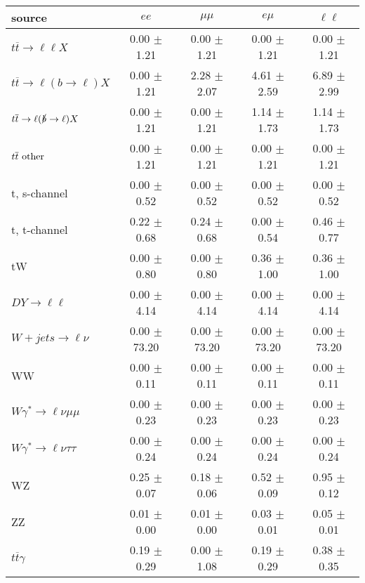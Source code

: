 \begin{tabular}{l|cccc} \hline\hline
source & $ee$ & $\mu\mu$ & $e\mu$ & $\ell\ell $ \\
\hline
$t\overline{t} \rightarrow \ell \ell X$ &  0.00 $\pm$  1.21 &  0.00 $\pm$  1.21 &  0.00 $\pm$  1.21 &  0.00 $\pm$  1.21 \\
$t\overline{t} \rightarrow \ell (b \rightarrow \ell) X$ &  0.00 $\pm$  1.21 &  2.28 $\pm$  2.07 &  4.61 $\pm$  2.59 &  6.89 $\pm$  2.99 \\
$t\overline{t} \rightarrow \ell (\slashed b \rightarrow \ell) X$ &  0.00 $\pm$  1.21 &  0.00 $\pm$  1.21 &  1.14 $\pm$  1.73 &  1.14 $\pm$  1.73 \\
        $t\overline{t}\ \rm{other}$ &  0.00 $\pm$  1.21 &  0.00 $\pm$  1.21 &  0.00 $\pm$  1.21 &  0.00 $\pm$  1.21 \\
\hline
                       t, s-channel &  0.00 $\pm$  0.52 &  0.00 $\pm$  0.52 &  0.00 $\pm$  0.52 &  0.00 $\pm$  0.52 \\
                       t, t-channel &  0.22 $\pm$  0.68 &  0.24 $\pm$  0.68 &  0.00 $\pm$  0.54 &  0.46 $\pm$  0.77 \\
                                 tW &  0.00 $\pm$  0.80 &  0.00 $\pm$  0.80 &  0.36 $\pm$  1.00 &  0.36 $\pm$  1.00 \\
\hline
         $DY \rightarrow \ell \ell$ &  0.00 $\pm$  4.14 &  0.00 $\pm$  4.14 &  0.00 $\pm$  4.14 &  0.00 $\pm$  4.14 \\
      $W+jets \rightarrow \ell \nu$ &  0.00 $\pm$ 73.20 &  0.00 $\pm$ 73.20 &  0.00 $\pm$ 73.20 &  0.00 $\pm$ 73.20 \\
                                 WW &  0.00 $\pm$  0.11 &  0.00 $\pm$  0.11 &  0.00 $\pm$  0.11 &  0.00 $\pm$  0.11 \\
\hline
$W\gamma^{*} \rightarrow \ell \nu \mu\mu$ &  0.00 $\pm$  0.23 &  0.00 $\pm$  0.23 &  0.00 $\pm$  0.23 &  0.00 $\pm$  0.23 \\
$W\gamma^{*} \rightarrow \ell \nu \tau\tau$ &  0.00 $\pm$  0.24 &  0.00 $\pm$  0.24 &  0.00 $\pm$  0.24 &  0.00 $\pm$  0.24 \\
                                 WZ &  0.25 $\pm$  0.07 &  0.18 $\pm$  0.06 &  0.52 $\pm$  0.09 &  0.95 $\pm$  0.12 \\
                                 ZZ &  0.01 $\pm$  0.00 &  0.01 $\pm$  0.00 &  0.03 $\pm$  0.01 &  0.05 $\pm$  0.01 \\
\hline
              $t\overline{t}\gamma$ &  0.19 $\pm$  0.29 &  0.00 $\pm$  1.08 &  0.19 $\pm$  0.29 &  0.38 $\pm$  0.35 \\

\end{tabular}
